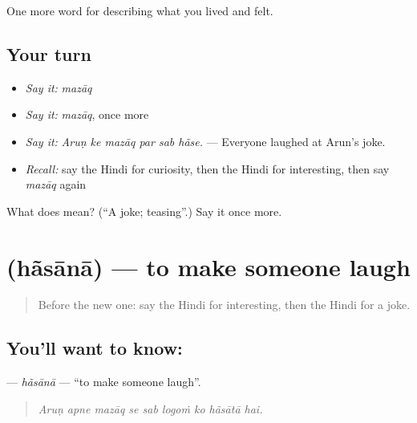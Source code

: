 \begin{grammarlens}[title={What you've built}]
One more word for describing what you lived and felt.
\end{grammarlens}

\subsection*{Your turn}
\begin{itemize}
\raggedright
  \item \emph{Say it:} \emph{mazāq}
  \item \emph{Say it:} \emph{mazāq}, once more
  \item \emph{Say it:} \emph{Aruṇ ke mazāq par sab hãse.} — Everyone laughed at Arun's joke.
  \item \emph{Recall:} say the Hindi for curiosity, then the Hindi for interesting, then say \emph{mazāq} again
\end{itemize}

\begin{tcolorbox}[breakable,colback=teal!4,colframe=teal!35!black,title={Before you move on}]
What does  mean? (\textquotedblleft{}A joke; teasing\textquotedblright{}.) Say it once more.
\end{tcolorbox}
\section[\texorpdfstring{\hi{हँसाना} (hãsānā)}{हँसाना (hãsānā)}]{ (hãsānā) — to make someone laugh}

\label{lesson:HI-C465-hasana}



\begin{quote}
Before the new one: say the Hindi for interesting, then the Hindi for a joke.
\end{quote}

\subsection*{You'll want to know: }
\textbf{} — \emph{hãsānā} — \textquotedblleft{}to make someone laugh\textquotedblright{}.

\begin{quote}
        
\end{quote}

\begin{quote}
\emph{Aruṇ apne mazāq se sab logoṁ ko hãsātā hai.}
\end{quote}

